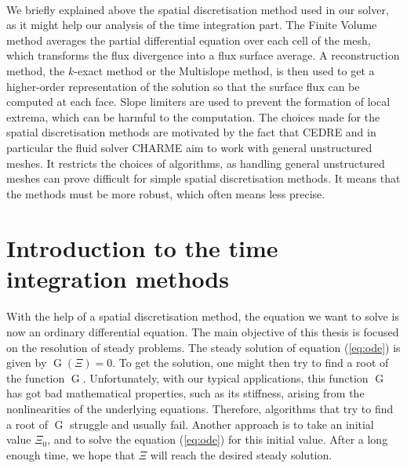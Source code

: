       \paragraph{}
      We briefly explained above the spatial discretisation method used in our solver, as it might help our analysis of the time integration part.
      The Finite Volume method averages the partial differential equation over each cell of the mesh, which transforms the flux divergence into a flux surface average.
      A reconstruction method, the $k$-exact method or the Multislope method, is then used to get a higher-order representation of the solution so that the surface flux can be computed at each face.
      Slope limiters are used to prevent the formation of local extrema, which can be harmful to the computation.
      The choices made for the spatial discretisation methods are motivated by the fact that CEDRE and in particular the fluid solver CHARME aim to work with general unstructured meshes.
      It restricts the choices of algorithms, as handling general unstructured meshes can prove difficult for simple spatial discretisation methods.
      It means that the methods must be more robust, which often means less precise.


  \section{Introduction to the time integration methods}

    \paragraph{}
    With the help of a spatial discretisation method, the equation we want to solve is now an ordinary differential equation.
    The main objective of this thesis is focused on the resolution of steady problems.
    The steady solution of equation (\ref{eq:ode}) is given by $\operatorname{G}\left(\Xi\right) = 0$.
    To get the solution, one might then try to find a root of the function $\operatorname{G}$.
    Unfortunately, with our typical applications, this function $\operatorname{G}$ has got bad mathematical properties, such as its stiffness, arising from the nonlinearities of the underlying equations.
    Therefore, algorithms that try to find a root of $\operatorname{G}$ struggle and usually fail.
    Another approach is to take an initial value $\Xi_0$, and to solve the equation (\ref{eq:ode}) for this initial value.
    After a long enough time, we hope that $\Xi$ will reach the desired steady solution.

